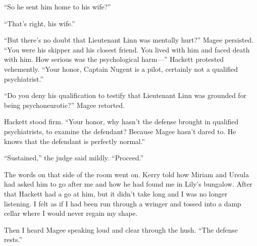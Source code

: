 {“So he sent him home to his wife?”

“That’s right, his wife.”

“But there’s no doubt that Lieutenant Linn was mentally hurt?” Magee persisted. “You were his skipper and his closest friend. You lived with him and faced death with him. How serious was the psychological harm—” Hackett protested vehemently. “Your honor, Captain Nugent is a pilot, certainly not a qualified psychiatrist.”

“Do you deny his qualification to testify that Lieutenant Linn was grounded for being psychoneurotic?” Magee retorted.

Hackett stood firm. “Your honor, why hasn’t the defense brought in qualified psychiatrists, to examine the defendant? Because Magee hasn’t dared to. He knows that the defendant is perfectly normal.”

“Sustained,” the judge said mildly. “Proceed.”

The words on that side of the room went on. Kerry told how Miriam and Ursula had asked him to go after me and how he had found me in Lily’s bungalow. After that Hackett had a go at him, but it didn’t take long and I was no longer listening. I felt as if I had been run through a wringer and tossed into a damp cellar where I would never regain my shape.

Then I heard Magee speaking loud and clear through the hush. “The defense rests.”

}

\vspace{2\nbs}
\clearpage
\thispagestyle{empty}


